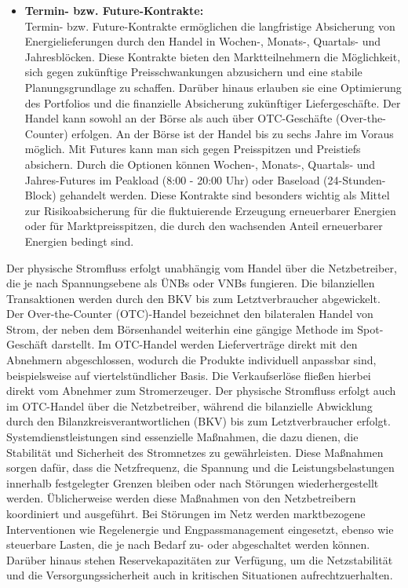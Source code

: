 \begin{itemize}[label={--}]
\item \textbf{Termin- bzw. Future-Kontrakte:}\\ Termin- bzw. Future-Kontrakte ermöglichen die langfristige Absicherung von Energielieferungen durch den Handel in Wochen-, Monats-, Quartals- und Jahresblöcken. Diese Kontrakte bieten den Marktteilnehmern die Möglichkeit, sich gegen zukünftige Preisschwankungen abzusichern und eine stabile Planungsgrundlage zu schaffen. Darüber hinaus erlauben sie eine Optimierung des Portfolios und die finanzielle Absicherung zukünftiger Liefergeschäfte. Der Handel kann sowohl an der Börse als auch über OTC-Geschäfte (Over-the-Counter) erfolgen. An der Börse ist der Handel bis zu sechs Jahre im Voraus möglich. Mit Futures kann man sich gegen Preisspitzen und Preistiefs absichern. Durch die Optionen können Wochen-, Monats-, Quartals- und Jahres-Futures im Peakload (8:00 - 20:00 Uhr) oder Baseload (24-Stunden-Block) gehandelt werden. Diese Kontrakte sind besonders wichtig als Mittel zur Risikoabsicherung für die fluktuierende Erzeugung erneuerbarer Energien oder für Marktpreisspitzen, die durch den wachsenden Anteil erneuerbarer Energien bedingt sind.
\end{itemize}

Der physische Stromfluss erfolgt unabhängig vom Handel über die Netzbetreiber, die je nach Spannungsebene als ÜNBs oder VNBs fungieren. Die bilanziellen Transaktionen werden durch den BKV bis zum Letztverbraucher abgewickelt.\\

Der Over-the-Counter (OTC)-Handel bezeichnet den bilateralen Handel von Strom, der neben dem Börsenhandel weiterhin eine gängige Methode im Spot-Geschäft darstellt. Im OTC-Handel werden Lieferverträge direkt mit den Abnehmern abgeschlossen, wodurch die Produkte individuell anpassbar sind, beispielsweise auf viertelstündlicher Basis. Die Verkaufserlöse fließen hierbei direkt vom Abnehmer zum Stromerzeuger. Der physische Stromfluss erfolgt auch im OTC-Handel über die Netzbetreiber, während die bilanzielle Abwicklung durch den Bilanzkreisverantwortlichen (BKV) bis zum Letztverbraucher erfolgt.\\

Systemdienstleistungen sind essenzielle Maßnahmen, die dazu dienen, die Stabilität und Sicherheit des Stromnetzes zu gewährleisten. Diese Maßnahmen sorgen dafür, dass die Netzfrequenz, die Spannung und die Leistungsbelastungen innerhalb festgelegter Grenzen bleiben oder nach Störungen wiederhergestellt werden. Üblicherweise werden diese Maßnahmen von den Netzbetreibern koordiniert und ausgeführt. Bei Störungen im Netz werden marktbezogene Interventionen wie Regelenergie und Engpassmanagement eingesetzt, ebenso wie steuerbare Lasten, die je nach Bedarf zu- oder abgeschaltet werden können. Darüber hinaus stehen Reservekapazitäten zur Verfügung, um die Netzstabilität und die Versorgungssicherheit auch in kritischen Situationen aufrechtzuerhalten.\\

